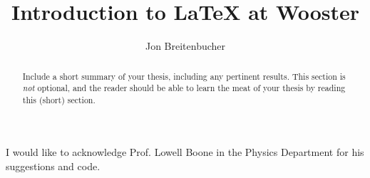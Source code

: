 \documentclass[palatino,code,picins,tikz,kaukecopyright,openright,lshortwooster,dropcaps,verbatim,index,oneside,euler]{woosterthesis}
\title{Introduction to \LaTeX{} at Wooster}
\author{Jon Breitenbucher}
\begin{document}
%
%

\frontmatter
{}

%                                                                                       
%                                                                                       

\begin{abstract}
Include a short summary of your thesis, including any pertinent results.  This section is \emph{not} optional, and the reader should be able to learn the meat of your thesis by reading this (short) section.
\end{abstract}

%                                                                                       
%                                                                                       

\dedication{This work is dedicated to the future generations of Wooster students.}


%                                                                                       
%                                                                                       

\begin{acknowl}  
I would like to acknowledge Prof. Lowell Boone in the Physics Department for his suggestions and code.
\end{acknowl}
\end{document}
